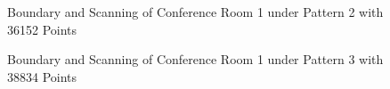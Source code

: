 \documentclass[11pt, a4paper,oneside,chapterprefix=false]{scrbook}
\begin{document}
\vspace{80pt}

\begin{figure}[H]
    \centering
      \label{fig:conf1 b 1} \hfill
     \label{fig:conf1 s 1}
    \caption{Boundary and Scanning of Conference Room 1 under Pattern 2 with 36152 Points}
    \label{fig:conf1 1}
\end{figure}

\vspace{80pt}

\begin{figure}[H]
    \centering
      \label{fig:conf1 b 2} \hfill
     \label{fig:conf1 s 2}
    \caption{Boundary and Scanning of Conference Room 1 under Pattern 3 with 38834 Points}
    \label{fig:conf1 2}
\end{figure}
\end{document}
